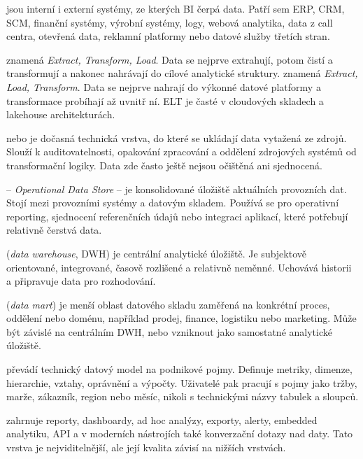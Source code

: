  jsou interní i externí systémy, ze kterých BI čerpá data. Patří sem ERP, CRM, SCM, finanční systémy, výrobní systémy, logy, webová analytika, data z call centra, otevřená data, reklamní platformy nebo datové služby třetích stran.

 znamená \textit{Extract, Transform, Load}. Data se nejprve extrahují, potom čistí a transformují a nakonec nahrávají do cílové analytické struktury.  znamená \textit{Extract, Load, Transform}. Data se nejprve nahrají do výkonné datové platformy a transformace probíhají až uvnitř ní. ELT je časté v cloudových skladech a lakehouse architekturách.

 nebo  je dočasná technická vrstva, do které se ukládají data vytažená ze zdrojů. Slouží k auditovatelnosti, opakování zpracování a oddělení zdrojových systémů od transformační logiky. Data zde často ještě nejsou očištěná ani sjednocená.

 -- \textit{Operational Data Store} -- je konsolidované úložiště aktuálních provozních dat. Stojí mezi provozními systémy a datovým skladem. Používá se pro operativní reporting, sjednocení referenčních údajů nebo integraci aplikací, které potřebují relativně čerstvá data.

 (\textit{data warehouse}, DWH) je centrální analytické úložiště. Je subjektově orientované, integrované, časově rozlišené a relativně neměnné. Uchovává historii a připravuje data pro rozhodování.

 (\textit{data mart}) je menší oblast datového skladu zaměřená na konkrétní proces, oddělení nebo doménu, například prodej, finance, logistiku nebo marketing. Může být závislé na centrálním DWH, nebo vzniknout jako samostatné analytické úložiště.

 převádí technický datový model na podnikové pojmy. Definuje metriky, dimenze, hierarchie, vztahy, oprávnění a výpočty. Uživatelé pak pracují s pojmy jako tržby, marže, zákazník, region nebo měsíc, nikoli s technickými názvy tabulek a sloupců.

 zahrnuje reporty, dashboardy, ad hoc analýzy, exporty, alerty, embedded analytiku, API a v moderních nástrojích také konverzační dotazy nad daty. Tato vrstva je nejviditelnější, ale její kvalita závisí na nižších vrstvách.

